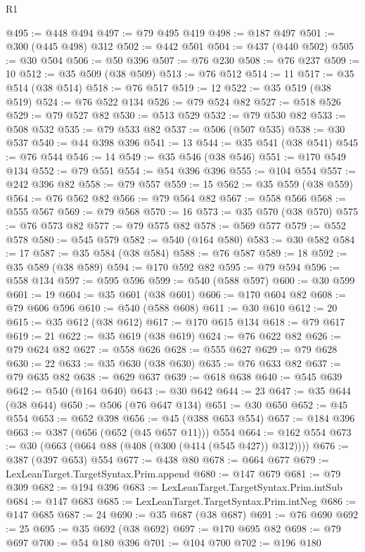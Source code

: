 \begin{lexlean}{R1}
\begin{coremodule}
{{{{{{{{{{{{{{{{{{{{{{{{{{{{{{{{{{{{{{{{{{{{{{{{{{@495 := @448 @494
@497 := @79 @495 @419
@498 := @187 @497
@501 := @300 (@445 @498) @312
@502 := @442 @501
@504 := @437 (@440 @502)
@505 := @30 @504
@506 := @50 @396
@507 := @76 @230
@508 := @76 @237
@509 := 10
@512 := @35 @509 (@38 @509)
@513 := @76 @512
@514 := 11
@517 := @35 @514 (@38 @514)
@518 := @76 @517
@519 := 12
@522 := @35 @519 (@38 @519)
@524 := @76 @522 @134
@526 := @79 @524 @82
@527 := @518 @526
@529 := @79 @527 @82
@530 := @513 @529
@532 := @79 @530 @82
@533 := @508 @532
@535 := @79 @533 @82
@537 := @506 (@507 @535)
@538 := @30 @537
@540 := @44 @398 @396
@541 := 13
@544 := @35 @541 (@38 @541)
@545 := @76 @544
@546 := 14
@549 := @35 @546 (@38 @546)
@551 := @170 @549 @134
@552 := @79 @551
@554 := @54 @396 @396
@555 := @104 @554
@557 := @242 @396 @82
@558 := @79 @557
@559 := 15
@562 := @35 @559 (@38 @559)
@564 := @76 @562 @82
@566 := @79 @564 @82
@567 := @558 @566
@568 := @555 @567
@569 := @79 @568
@570 := 16
@573 := @35 @570 (@38 @570)
@575 := @76 @573 @82
@577 := @79 @575 @82
@578 := @569 @577
@579 := @552 @578
@580 := @545 @579
@582 := @540 (@164 @580)
@583 := @30 @582
@584 := 17
@587 := @35 @584 (@38 @584)
@588 := @76 @587
@589 := 18
@592 := @35 @589 (@38 @589)
@594 := @170 @592 @82
@595 := @79 @594
@596 := @558 @134
@597 := @595 @596
@599 := @540 (@588 @597)
@600 := @30 @599
@601 := 19
@604 := @35 @601 (@38 @601)
@606 := @170 @604 @82
@608 := @79 @606 @596
@610 := @540 (@588 @608)
@611 := @30 @610
@612 := 20
@615 := @35 @612 (@38 @612)
@617 := @170 @615 @134
@618 := @79 @617
@619 := 21
@622 := @35 @619 (@38 @619)
@624 := @76 @622 @82
@626 := @79 @624 @82
@627 := @558 @626
@628 := @555 @627
@629 := @79 @628
@630 := 22
@633 := @35 @630 (@38 @630)
@635 := @76 @633 @82
@637 := @79 @635 @82
@638 := @629 @637
@639 := @618 @638
@640 := @545 @639
@642 := @540 (@164 @640)
@643 := @30 @642
@644 := 23
@647 := @35 @644 (@38 @644)
@650 := @506 (@76 @647 @134)
@651 := @30 @650
@652 := @45 @554
@653 := @652 @398
@656 := @45 (@388 @653 @554)
@657 := @184 @396
@663 := @387 (@656 (@652 (@45 @657 @11))) @554
@664 := @162 @554
@673 := @30 (@663 (@664 @88 (@408 (@300 (@414 (@545 @427)) @312))))
@676 := @387 (@397 @653) @554
@677 := @438 @80
@678 := @664 @677
@679 := LexLeanTarget.TargetSyntax.Prim.append
@680 := @147 @679
@681 := @79 @309
@682 := @194 @396
@683 := LexLeanTarget.TargetSyntax.Prim.intSub
@684 := @147 @683
@685 := LexLeanTarget.TargetSyntax.Prim.intNeg
@686 := @147 @685
@687 := 24
@690 := @35 @687 (@38 @687)
@691 := @76 @690
@692 := 25
@695 := @35 @692 (@38 @692)
@697 := @170 @695 @82
@698 := @79 @697
@700 := @54 @180 @396
@701 := @104 @700
@702 := @196 @180
}}}}}}}}}}}}}}}}}}}}}}}}}}}}}}}}}}}}}}}}}}}}}}}}}}
\end{coremodule}
\end{lexlean}

